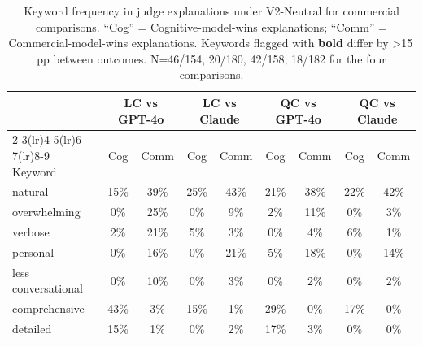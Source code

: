 \begin{table}[t]
\centering\small
\begin{tabular}{lcccccccc}
\toprule
& \multicolumn{2}{c}{LC vs GPT-4o} & \multicolumn{2}{c}{LC vs Claude} & \multicolumn{2}{c}{QC vs GPT-4o} & \multicolumn{2}{c}{QC vs Claude} \\
\cmidrule(lr){2-3}\cmidrule(lr){4-5}\cmidrule(lr){6-7}\cmidrule(lr){8-9}
Keyword & Cog & Comm & Cog & Comm & Cog & Comm & Cog & Comm \\
\midrule
natural & 15\% & 39\% & 25\% & 43\% & 21\% & 38\% & 22\% & 42\% \\
overwhelming & 0\% & 25\% & 0\% & 9\% & 2\% & 11\% & 0\% & 3\% \\
verbose & 2\% & 21\% & 5\% & 3\% & 0\% & 4\% & 6\% & 1\% \\
personal & 0\% & 16\% & 0\% & 21\% & 5\% & 18\% & 0\% & 14\% \\
less conversational & 0\% & 10\% & 0\% & 3\% & 0\% & 2\% & 0\% & 2\% \\
comprehensive & 43\% & 3\% & 15\% & 1\% & 29\% & 0\% & 17\% & 0\% \\
detailed & 15\% & 1\% & 0\% & 2\% & 17\% & 3\% & 0\% & 0\% \\
\bottomrule
\end{tabular}
\caption{Keyword frequency in judge explanations under V2-Neutral for commercial comparisons. ``Cog'' = Cognitive-model-wins explanations; ``Comm'' = Commercial-model-wins explanations. Keywords flagged with \textbf{bold} differ by >15\,pp between outcomes. N=46/154, 20/180, 42/158, 18/182 for the four comparisons.}
\label{tab:keyword_analysis}
\end{table}
